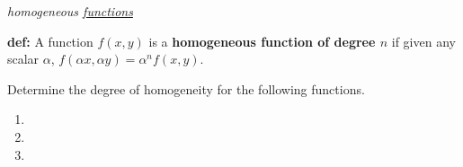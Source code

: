 \textit{homogeneous \underline{functions}}

\noindent \textbf{def:} A function $f(x,y)$ is a \textbf{homogeneous function of degree $n$} if given any scalar $\alpha$, $f(\alpha x, \alpha y) = \alpha^n f(x,y)$.

\noindent Determine the degree of homogeneity for the following functions.
\begin{enumerate}
    \item  \vspace{.5cm}
    \item  \vspace{.5cm}
    \item 
  \end{enumerate}